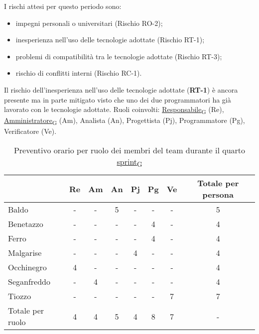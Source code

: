 I rischi attesi per questo periodo sono:
\begin{itemize}
	\item impegni personali o universitari (Rischio RO-2);
	\item inesperienza nell'uso delle tecnologie adottate (Rischio RT-1);
	\item problemi di compatibilità tra le tecnologie adottate (Rischio RT-3);
	\item rischio di conflitti interni (Rischio RC-1).
\end{itemize}
Il rischio dell'inesperienza nell'uso delle tecnologie adottate (\textbf{RT-1}) è ancora presente ma in parte mitigato visto che uno dei
due programmatori ha già lavorato con le tecnologie adottate.
\newpage
{}
Ruoli coinvolti: \href{https://7last.github.io/docs/rtb/documentazione-interna/glossario\#responsabile}{Responsabile\textsubscript{G}} (Re), \href{https://7last.github.io/docs/rtb/documentazione-interna/glossario\#amministratore}{Amministratore\textsubscript{G}} (Am), Analista (An), Progettista (Pj), Programmatore (Pg), Verificatore (Ve).
\begin{table}[!h]
	\centering
	\begin{tabular}{ | l | c | c | c | c | c | c | c | }
		\hline
		\textbf{}        & \textbf{Re} & \textbf{Am} & \textbf{An} & \textbf{Pj} & \textbf{Pg} & \textbf{Ve} & \textbf{Totale per persona} \\
		\hline
		Baldo            & -           & -           & 5           & -           & -           & -           & 5                           \\
		Benetazzo        & -           & -           & -           & -           & 4           & -           & 4                           \\
		Ferro            & -           & -           & -           & -           & 4           & -           & 4                           \\
		Malgarise        & -           & -           & -           & 4           & -           & -           & 4                           \\
		Occhinegro       & 4           & -           & -           & -           & -           & -           & 4                           \\
		Seganfreddo      & -           & 4           & -           & -           & -           & -           & 4                           \\
		Tiozzo           & -           & -           & -           & -           & -           & 7           & 7                           \\
		\hline
		Totale per ruolo & 4           & 4           & 5           & 4           & 8           & 7           & -                           \\
		\hline
	\end{tabular}
	\caption{Preventivo orario per ruolo dei membri del team durante il quarto \href{https://7last.github.io/docs/rtb/documentazione-interna/glossario\#sprint}{sprint\textsubscript{G}}}
	
\end{table}

